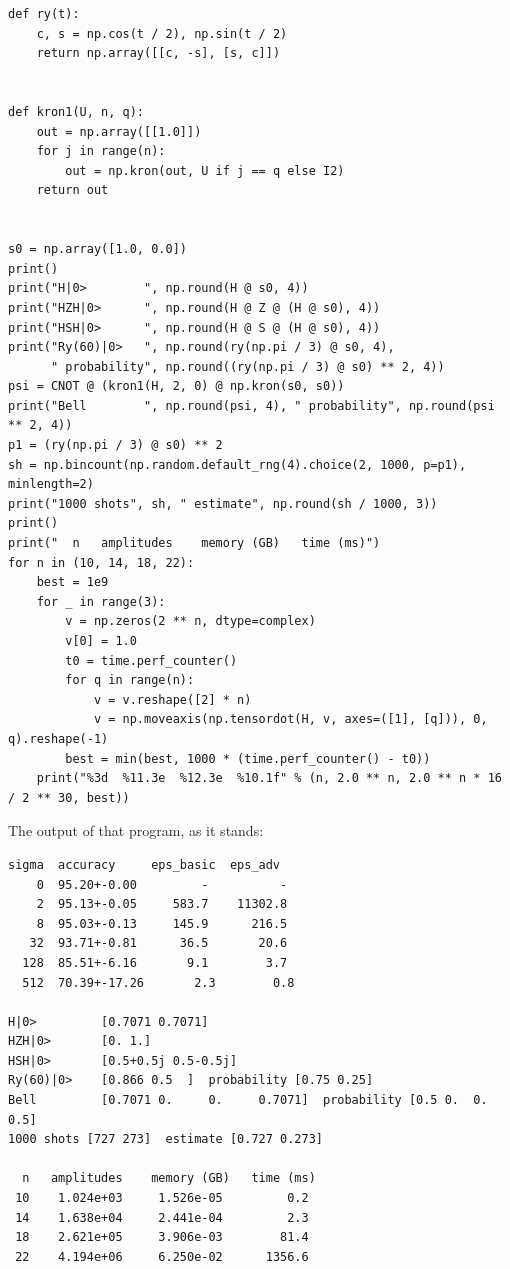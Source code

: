 \begin{lab}
\begin{verbatim}
def ry(t):
    c, s = np.cos(t / 2), np.sin(t / 2)
    return np.array([[c, -s], [s, c]])


def kron1(U, n, q):
    out = np.array([[1.0]])
    for j in range(n):
        out = np.kron(out, U if j == q else I2)
    return out


s0 = np.array([1.0, 0.0])
print()
print("H|0>        ", np.round(H @ s0, 4))
print("HZH|0>      ", np.round(H @ Z @ (H @ s0), 4))
print("HSH|0>      ", np.round(H @ S @ (H @ s0), 4))
print("Ry(60)|0>   ", np.round(ry(np.pi / 3) @ s0, 4),
      " probability", np.round((ry(np.pi / 3) @ s0) ** 2, 4))
psi = CNOT @ (kron1(H, 2, 0) @ np.kron(s0, s0))
print("Bell        ", np.round(psi, 4), " probability", np.round(psi ** 2, 4))
p1 = (ry(np.pi / 3) @ s0) ** 2
sh = np.bincount(np.random.default_rng(4).choice(2, 1000, p=p1), minlength=2)
print("1000 shots", sh, " estimate", np.round(sh / 1000, 3))
print()
print("  n   amplitudes    memory (GB)   time (ms)")
for n in (10, 14, 18, 22):
    best = 1e9
    for _ in range(3):
        v = np.zeros(2 ** n, dtype=complex)
        v[0] = 1.0
        t0 = time.perf_counter()
        for q in range(n):
            v = v.reshape([2] * n)
            v = np.moveaxis(np.tensordot(H, v, axes=([1], [q])), 0, q).reshape(-1)
        best = min(best, 1000 * (time.perf_counter() - t0))
    print("%3d  %11.3e  %12.3e  %10.1f" % (n, 2.0 ** n, 2.0 ** n * 16 / 2 ** 30, best))
\end{verbatim}

The output of that program, as it stands:

\begin{verbatim}
sigma  accuracy     eps_basic  eps_adv
    0  95.20+-0.00         -          -
    2  95.13+-0.05     583.7    11302.8
    8  95.03+-0.13     145.9      216.5
   32  93.71+-0.81      36.5       20.6
  128  85.51+-6.16       9.1        3.7
  512  70.39+-17.26       2.3        0.8

H|0>         [0.7071 0.7071]
HZH|0>       [0. 1.]
HSH|0>       [0.5+0.5j 0.5-0.5j]
Ry(60)|0>    [0.866 0.5  ]  probability [0.75 0.25]
Bell         [0.7071 0.     0.     0.7071]  probability [0.5 0.  0.  0.5]
1000 shots [727 273]  estimate [0.727 0.273]

  n   amplitudes    memory (GB)   time (ms)
 10    1.024e+03     1.526e-05         0.2
 14    1.638e+04     2.441e-04         2.3
 18    2.621e+05     3.906e-03        81.4
 22    4.194e+06     6.250e-02      1356.6
\end{verbatim}
\end{lab}

